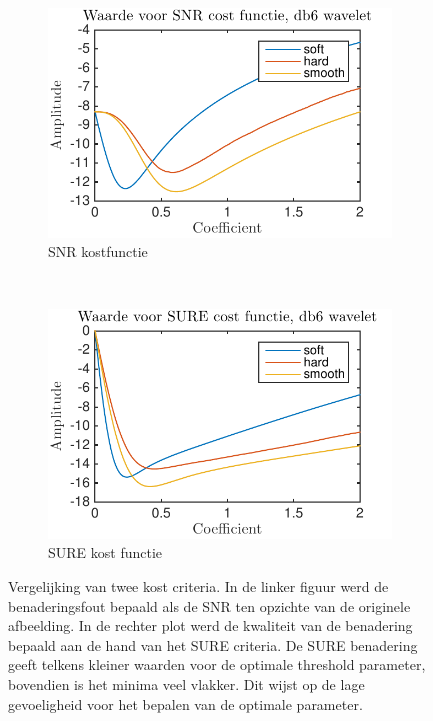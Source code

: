 \begin{figure}
    \centering
    \begin{subfigure}[b]{0.4\textwidth}
        \includegraphics[width=\textwidth]{../src/denoising/sure/SURE_cost_snr}
        \caption{SNR kostfunctie}
    \end{subfigure}
    ~ %
    \begin{subfigure}[b]{0.4\textwidth}
        \includegraphics[width=\textwidth]{../src/denoising/sure/SURE_cost}
        \caption{SURE kost functie}
    \end{subfigure}
    \caption{Vergelijking van twee kost criteria. In de linker figuur werd de benaderingsfout bepaald als de SNR ten opzichte van de originele afbeelding. In de rechter plot werd de kwaliteit van de benadering bepaald aan de hand van het SURE criteria. De SURE benadering geeft telkens kleiner waarden voor de optimale threshold parameter, bovendien is het minima veel vlakker. Dit wijst op de lage gevoeligheid voor het bepalen van de optimale parameter.}\label{fig:kost_crit}
\end{figure}



